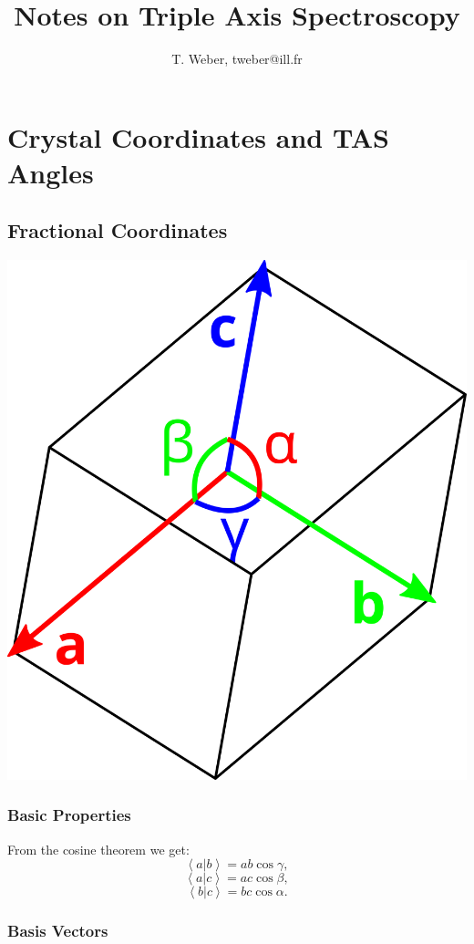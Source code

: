 \documentclass[english]{book}
\begin{document}
\title{Notes on Triple Axis Spectroscopy}
\author{T. Weber, tweber@ill.fr}
\maketitle
\tableofcontents





\chapter{Crystal Coordinates and TAS Angles}


\section{Fractional Coordinates}

\begin{center}
	\includegraphics[width = 0.2 \textwidth]{cell}
\end{center}

\subsection*{Basic Properties}

From the cosine theorem we get:
\begin{equation} \left< a | b \right > = ab \cos \gamma, \label{ab} \end{equation}
\begin{equation} \left< a | c \right > = ac \cos \beta, \label{ac} \end{equation}
\begin{equation} \left< b | c \right > = bc \cos \alpha. \label{bc} \end{equation}


\subsection*{Basis Vectors}
\end{document}
